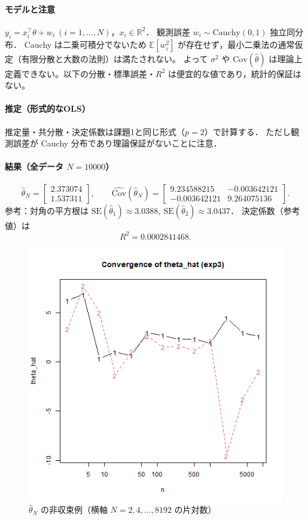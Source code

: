 \paragraph{モデルと注意}
$y_i=x_i^\top\theta+w_i\ (i=1,\dots,N)$，$x_i\in\mathbb{R}^2$．
観測誤差 $w_i\sim \mathrm{Cauchy}(0,1)$ 独立同分布．
Cauchy は二乗可積分でないため $\mathbb{E}[w_i^2]$ が存在せず，最小二乗法の通常仮定（有限分散と大数の法則）は満たされない。
よって $\sigma^2$ や $\mathrm{Cov}(\hat\theta)$ は理論上定義できない。以下の分散・標準誤差・$R^2$ は便宜的な値であり，統計的保証はない。

\paragraph{推定（形式的なOLS）}
推定量・共分散・決定係数は課題1と同じ形式（$p=2$）で計算する．
ただし観測誤差が Cauchy 分布であり理論保証がないことに注意．

\paragraph{結果（全データ $N=10000$）}
\[
\hat\theta_N=
\begin{bmatrix}
2.373074\\
1.537311
\end{bmatrix},\qquad
\widehat{\mathrm{Cov}}(\hat\theta_N)=
\begin{bmatrix}
9.234588215 & -0.003642121\\
-0.003642121 & 9.264075136
\end{bmatrix}.
\]
参考：対角の平方根は
$\mathrm{SE}(\hat\theta_1)\approx 3.0388,\ 
 \mathrm{SE}(\hat\theta_2)\approx 3.0437$．
決定係数（参考値）は
\[
R^2=0.0002841468.
\]

\begin{figure}[H]
  \centering
  \includegraphics[width=0.75\linewidth]{graphs/task3.png}
  \caption{$\hat\theta_N$ の非収束例（横軸 $N=2,4,\dots,8192$ の片対数）}
  \label{fig:task3-conv}
\end{figure}

